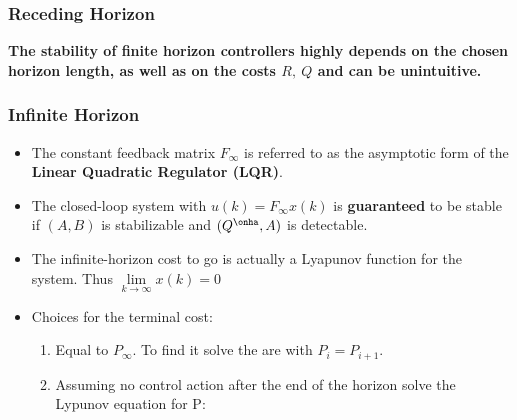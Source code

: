\documentclass[8pt,a4paper]{scrartcl}
\begin{document}
\begin{multicols*}{3}
\begin{multicols*}{4}
{\subsubsection{Receding Horizon}



\textbf{The stability of finite horizon controllers highly depends on the chosen horizon length, as well as on the costs $R,\ Q$ and can be unintuitive.}

}%

\subsubsection{Infinite Horizon}






\longversion{}%
\begin{itemize}

\item The constant feedback matrix $F_\infty$ is referred to as the asymptotic form of the \textbf{Linear Quadratic Regulator (LQR)}.
\item The closed-loop system with $u(k)=F_\infty x(k)$ is \textbf{guaranteed} to be stable if $(A,B)$ is stabilizable and $(Q^\onha,A)$ is detectable.
\item The infinite-horizon cost to go is actually a Lyapunov function for the system. Thus $\lim\limits_{k\rightarrow\infty}x(k)=0$
\item Choices for the terminal cost:
\begin{enumerate}
\item Equal to $P_\infty$. To find it solve the are with $P_i=P_{i+1}$.
\item Assuming no control action after the end of the horizon \dahe solve the Lypunov equation for P:


\end{enumerate}
\end{itemize}
\end{multicols*}
\end{multicols*}
\end{document}
